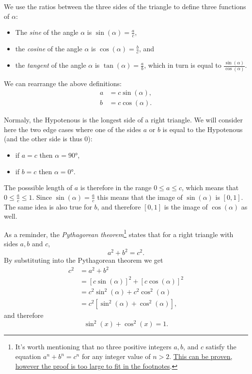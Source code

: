 We use the ratios between the three sides of the triangle to define three functions of $\alpha$:
\vspace{5mm}
\begin{itemize}
	\item The \emph{sine} of the angle $\alpha$ is $\sin(\alpha)=\frac{a}{c}$,
	\item the \emph{cosine} of the angle $\alpha$ is $\cos(\alpha)=\frac{b}{c}$, and
	\item the \emph{tangent} of the angle $\alpha$ is $\tan(\alpha)=\frac{a}{b}$, which in turn is equal to $\frac{\sin(\alpha)}{\cos(\alpha)}$.
\end{itemize}

We can rearrange the above definitions:
\begin{align}
	a &= c\sin(\alpha),\nonumber\\
	b &= c\cos(\alpha).
	\label{eq:basic_trig_rearrange}
\end{align}

Normaly, the Hypotenous is the longest side of a right triangle. We will consider here the two edge cases where one of the sides $a$ or $b$ is equal to the Hypotenous (and the other side is thus $0$):
\begin{itemize}
	\item if $a=c$ then $\alpha=\ang{90}$,\
	\item if $b=c$ then $\alpha=\ang{0}$.
\end{itemize}

The posssible length of $a$ is therefore in the range $0\leq a \leq c$, which means that $0\leq \frac{a}{c} \leq 1$. Since $\sin(\alpha)=\frac{a}{c}$ this means that the image of $\sin(\alpha)$ is $[0,1]$. The same idea is also true for $b$, and therefore $[0,1]$ is the image of $\cos(\alpha)$ as well.

As a reminder, the \emph{Pythagorean theorem}\footnote{It's worth mentioning that no three positive integers $a, b$, and $c$ satisfy the equation $a^{n}+b^{n}=c^{n}$ for any integer value of $n>2$. \href{https://en.wikipedia.org/wiki/Fermat\%27s_Last_Theorem}{This can be proven, however the proof is too large to fit in the footnotes}.} states that for a right triangle with sides $a, b$ and $c$,
\begin{equation}
	a^{2} + b^{2} = c^{2}.
	\label{eq:pythagorean_theorem}
\end{equation}
By substituting  into the Pythagorean theorem we get
\begin{align*}
	c^{2} &= a^{2}+b^{2}\\
	&= \left[ c\sin(\alpha) \right]^{2} + \left[ c\cos(\alpha) \right]^{2}\\
	&= c^{2}\sin^{2}(\alpha) + c^{2}\cos^{2}(\alpha)\\
	&= c^{2}\left[ \sin^{2}(\alpha) + \cos^{2}(\alpha) \right],
\end{align*}
and therefore
\begin{equation}
	\sin^{2}(x) + \cos^{2}(x) = 1.
	\label{eq:sin sqr plus cos sqr equals 1}
\end{equation}

